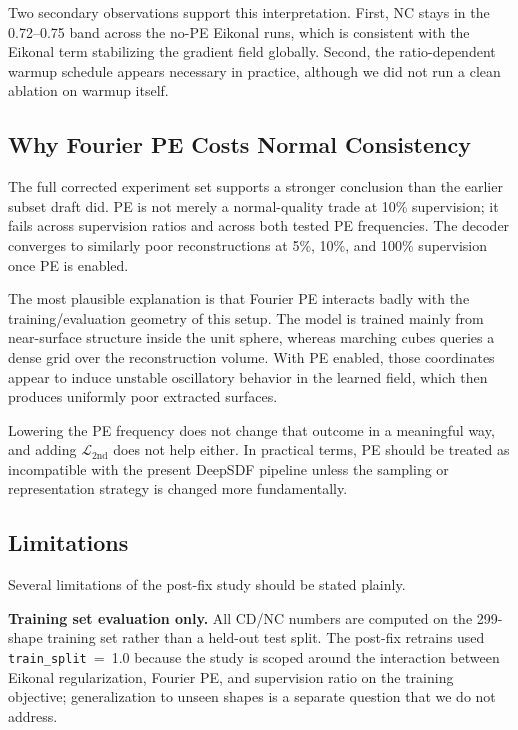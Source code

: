\documentclass[conference]{IEEEtran}
\begin{document}
Two secondary observations support this interpretation. First, NC stays in the
0.72--0.75 band across the no-PE Eikonal runs, which is consistent with the
Eikonal term stabilizing the gradient field globally. Second, the ratio-dependent
warmup schedule appears necessary in practice, although we did not run a clean
ablation on warmup itself.

\subsection{Why Fourier PE Costs Normal Consistency}
\label{sec:why_pe}

The full corrected experiment set supports a stronger conclusion than the
earlier subset draft did. PE is not merely a normal-quality trade at 10\%
supervision; it fails across supervision ratios and across both tested PE
frequencies. The decoder converges to similarly poor reconstructions at 5\%,
10\%, and 100\% supervision once PE is enabled.

The most plausible explanation is that Fourier PE interacts badly with the
training/evaluation geometry of this setup. The model is trained mainly from
near-surface structure inside the unit sphere, whereas marching cubes queries a
dense grid over the reconstruction volume. With PE enabled, those coordinates
appear to induce unstable oscillatory behavior in the learned field, which then
produces uniformly poor extracted surfaces.

Lowering the PE frequency does not change that outcome in a meaningful way, and
adding $\mathcal{L}_{\text{2nd}}$ does not help either. In practical terms, PE
should be treated as incompatible with the present DeepSDF pipeline unless the
sampling or representation strategy is changed more fundamentally.

\subsection{Limitations}
\label{sec:limitations}

Several limitations of the post-fix study should be stated plainly.

\textbf{Training set evaluation only.} All CD/NC numbers are computed on the 299-shape training set rather than a held-out test split. The post-fix retrains used \texttt{train\_split}~=~1.0 because the study is scoped around the interaction between Eikonal regularization, Fourier PE, and supervision ratio on the training objective; generalization to unseen shapes is a separate question that we do not address.
\end{document}
